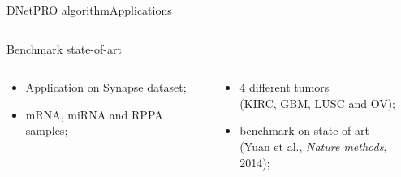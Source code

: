 \documentclass{standalone}
\begin{document}
\begin{frame}{DNetPRO algorithm}{Applications}
\begin{columns}
\begin{column}{0.5\textwidth}
    \end{column}

  \end{columns}


  \begin{alertblock}{Benchmark state-of-art}

    \begin{columns}
      \begin{column}{0.4\linewidth}

        \begin{itemize}
          \item Application on Synapse dataset;
          \item mRNA, miRNA and RPPA samples;
        \end{itemize}

      \end{column}
      \begin{column}{0.6\linewidth}

        \begin{itemize}
          \item 4 different tumors\\(KIRC, GBM, LUSC and OV);
          \item benchmark on state-of-art\\(Yuan et al., \emph{Nature methods}, 2014);
        \end{itemize}
      \end{column}
    \end{columns}

  \end{alertblock}

\end{frame}
\end{document}
